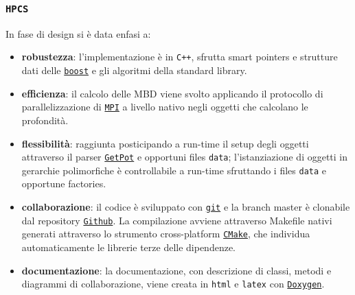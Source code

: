 \documentclass[9pt]{beamer}
\begin{document}
\begin{frame}
\frametitle{\texttt{HPCS}}
\begin{center}
\end{center}


In fase di design si \`e data enfasi a:
\begin{itemize}
\item \textbf{robustezza}: l'implementazione \`e in \texttt{C++}, sfrutta smart pointers e strutture dati delle \href{http://www.boost.org}{\texttt{boost}} e gli algoritmi della standard library.
\item \textbf{efficienza}: il calcolo delle MBD viene svolto applicando il protocollo di parallelizzazione di \href{http://www.open-mpi.org}{\texttt{MPI}} a livello nativo negli oggetti che calcolano le profondit\`a.
\item \textbf{flessibilit\`a}: raggiunta posticipando a run-time il setup degli oggetti attraverso il parser \href{http://getpot.sourceforge.net}{\texttt{GetPot}} e opportuni files \texttt{data};
					     l'istanziazione di oggetti in gerarchie polimorfiche \`e controllabile a run-time sfruttando i files \texttt{data} e opportune factories.
\item \textbf{collaborazione}: il codice \`e sviluppato con \href{http://git-scm.com}{\texttt{git}} e la branch master \`e clonabile dal repository \href{https://github.com/larvatus/HPCS}{ \texttt{Github}}.
						  La compilazione avviene attraverso Makefile nativi generati attraverso lo strumento cross-platform \href{http://www.cmake.org}{\texttt{CMake}}, che individua automaticamente le
						  librerie terze delle dipendenze.
\item \textbf{documentazione}: la documentazione, con descrizione di classi, metodi e diagrammi di collaborazione, viene creata in \texttt{html} e \texttt{latex} con  \href{http://www.doxygen.org}{\texttt{Doxygen}}.
\end{itemize}

\end{frame}

\end{document}
